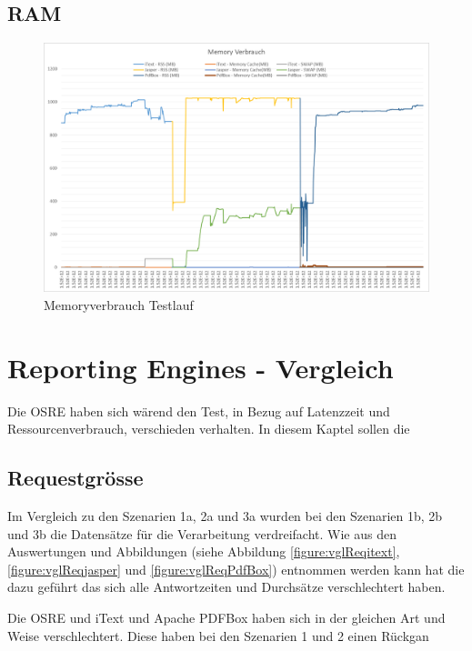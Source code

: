 \documentclass[main.tex]{subfiles}
\begin{document}
\subsection{RAM}



\begin{figure}[h]
\includegraphics[width=\textwidth]{mainpart/4_analyse_img/MemoryVerbrauch.png}
 \caption{Memoryverbrauch Testlauf}
 \label{figure:memorytestlauf}
\end{figure}




\section{Reporting Engines - Vergleich}


Die OSRE haben sich wärend den Test, in Bezug auf Latenzzeit und Ressourcenverbrauch, verschieden verhalten. In diesem Kaptel sollen die  

\subsection{Requestgrösse}

Im Vergleich zu den Szenarien 1a, 2a und 3a wurden bei den Szenarien 1b, 2b und 3b die Datensätze für die Verarbeitung verdreifacht. Wie aus den Auswertungen und Abbildungen (siehe Abbildung \ref{figure:vglReqitext}, \ref{figure:vglReqjasper} und \ref{figure:vglReqPdfBox}) entnommen werden kann hat die dazu geführt das sich alle Antwortzeiten und Durchsätze verschlechtert haben.

Die OSRE und iText und Apache PDFBox haben sich in der gleichen Art und Weise verschlechtert. Diese haben bei den Szenarien 1 und 2 einen Rückgan
\end{document}
